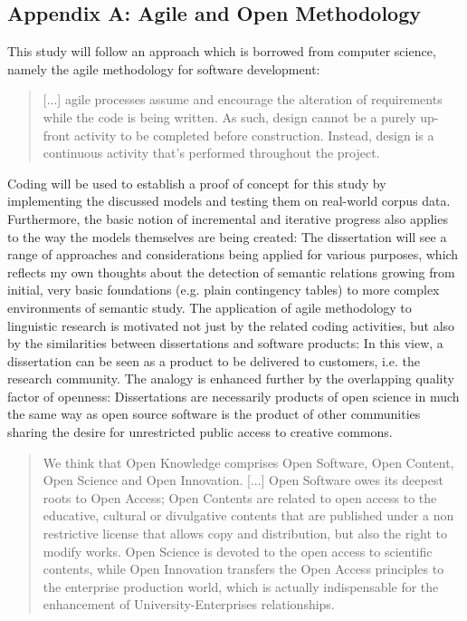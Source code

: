 \documentclass[jou]{apa6} %
\begin{document}
\subsection{Appendix A: Agile and Open Methodology}
\label{sec:appendixA}

This study will follow an approach which is borrowed from computer science, namely the agile methodology for software development:
\blockquote[{\cite[p.~32]{fowlerAgileManifesto2001}}]{[...] agile processes assume and encourage the alteration of requirements while the code is being written. As such, design cannot be a purely up-front activity to be completed before construction. Instead, design is a continuous activity that's performed throughout the project.}
Coding will be used to establish a proof of concept for this study by implementing the discussed models and testing them on real-world corpus data. Furthermore, the basic notion of incremental and iterative progress also applies to the way the models themselves are being created: The dissertation will see a range of approaches and considerations being applied for various purposes, which reflects my own thoughts about the detection of semantic relations growing from initial, very basic foundations (e.g. plain contingency tables) to more complex environments of semantic study. The application of agile methodology to linguistic research is motivated not just by the related coding activities, but also by the similarities between dissertations and software products: In this view, a dissertation can be seen as a product to be delivered to customers, i.e. the research community. The analogy is enhanced further by the overlapping quality factor of openness: Dissertations are necessarily products of open science in much the same way as open source software is the product of other communities sharing the desire for unrestricted public access to creative commons.
\blockquote[{\cite[p.~518]{garcia-penalvoOpenKnowledgeManagement2010}}]{We think that Open Knowledge comprises Open Software, Open Content, Open Science and Open Innovation. [...] Open Software owes its deepest roots to Open Access; Open Contents are related to open access to the educative, cultural or divulgative contents that are published under a non restrictive license that allows copy and distribution, but also the right to modify works. Open Science is devoted to the open access to scientific contents, while Open Innovation transfers the Open Access principles to the enterprise production world, which is actually indispensable for the enhancement of University-Enterprises relationships.}
\end{document}
